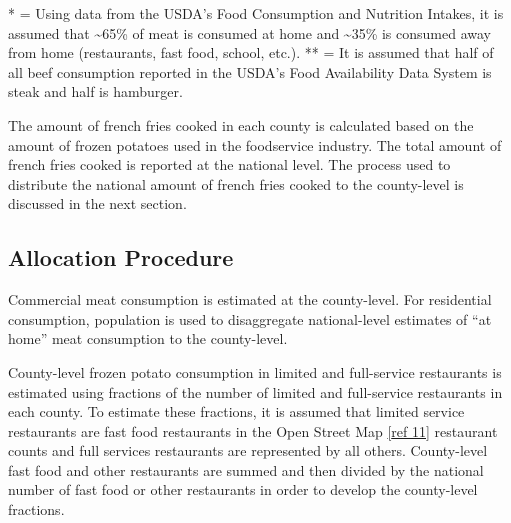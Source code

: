 \documentclass[
  11pt,
  oneside]{book}
\begin{document}
\begin{table}[H]
\centering
\caption{\label{tab:scale-factor}Scale Factor Derivation}
\centering
{}
\end{table}

\noindent
* = Using data from the USDA's Food Consumption and Nutrition Intakes, it is assumed that \textasciitilde65\% of meat is consumed at home and \textasciitilde35\% is consumed away from home (restaurants, fast food, school, etc.). \newline
** = It is assumed that half of all beef consumption reported in the USDA's Food Availability Data System is steak and half is hamburger. \newline

The amount of french fries cooked in each county is calculated based on the amount of frozen potatoes used in the foodservice industry. The total amount of french fries cooked is reported at the national level. The process used to distribute the national amount of french fries cooked to the county-level is discussed in the next section.

\subsection{Allocation Procedure}\label{allocation-procedure}

Commercial meat consumption is estimated at the county-level. For residential consumption, population is used to disaggregate national-level estimates of ``at home'' meat consumption to the county-level.

County-level frozen potato consumption in limited and full-service restaurants is estimated using fractions of the number of limited and full-service restaurants in each county. To estimate these fractions, it is assumed that limited service restaurants are fast food restaurants in the Open Street Map \hyperref[cooking-references]{{[}ref 11{]}} restaurant counts and full services restaurants are represented by all others. County-level fast food and other restaurants are summed and then divided by the national number of fast food or other restaurants in order to develop the county-level fractions.
\end{document}
